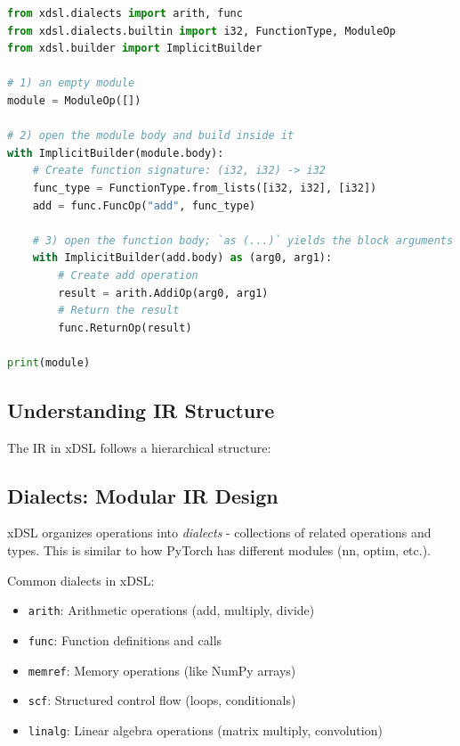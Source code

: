 \documentclass[11pt,a4paper]{article}
\begin{document}
\begin{lstlisting}[language=Python, caption=Creating IR in xDSL]
from xdsl.dialects import arith, func
from xdsl.dialects.builtin import i32, FunctionType, ModuleOp
from xdsl.builder import ImplicitBuilder

# 1) an empty module
module = ModuleOp([])

# 2) open the module body and build inside it
with ImplicitBuilder(module.body):
    # Create function signature: (i32, i32) -> i32
    func_type = FunctionType.from_lists([i32, i32], [i32])
    add = func.FuncOp("add", func_type)

    # 3) open the function body; `as (...)` yields the block arguments
    with ImplicitBuilder(add.body) as (arg0, arg1):
        # Create add operation
        result = arith.AddiOp(arg0, arg1)
        # Return the result
        func.ReturnOp(result)

print(module)
\end{lstlisting}

\subsection{Understanding IR Structure}

The IR in xDSL follows a hierarchical structure:


\subsection{Dialects: Modular IR Design}

xDSL organizes operations into \textit{dialects} - collections of related operations and types. This is similar to how PyTorch has different modules (nn, optim, etc.).

Common dialects in xDSL:
\begin{itemize}
    \item \texttt{arith}: Arithmetic operations (add, multiply, divide)
    \item \texttt{func}: Function definitions and calls
    \item \texttt{memref}: Memory operations (like NumPy arrays)
    \item \texttt{scf}: Structured control flow (loops, conditionals)
    \item \texttt{linalg}: Linear algebra operations (matrix multiply, convolution)
\end{itemize}
\end{document}
